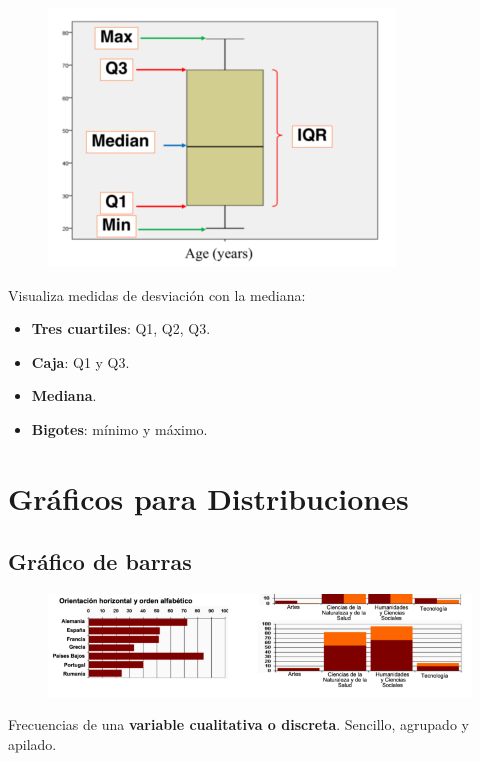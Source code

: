 \documentclass[12pt, twoside, openright]{report} %
\begin{document}
\begin{figure}[H]
	{\includegraphics[scale=.5]{Untitled 4.png}}
\end{figure}

Visualiza medidas de desviación con la mediana:

\begin{itemize}

\item
  \textbf{Tres cuartiles}: Q1, Q2, Q3.
\item
  \textbf{Caja}: Q1 y Q3.
\item
  \textbf{Mediana}.
\item
  \textbf{Bigotes}: mínimo y máximo.
\end{itemize}

\section{Gráficos para
Distribuciones}

\subsection{Gráfico de barras}

\begin{figure}[H]
	{\includegraphics[scale=.5]{Untitled 5.png}}
\end{figure}

Frecuencias de una \textbf{variable cualitativa o discreta}. Sencillo,
agrupado y apilado.
\end{document}
